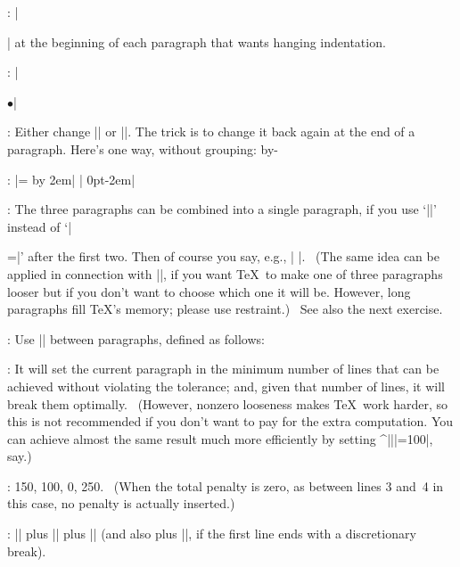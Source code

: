 {{:
 |\item{}| at the beginning of each paragraph that wants hanging
indentation.

:
 |\item{$\bullet$}|

:
 Either change |\hsize| or |\rightskip|. The trick is to change it back
again at the end of a paragraph. Here's one way, without grouping:
\begintt
\let\endgraf=\par \edef\restorehsize{\hsize=\the\hsize}
\def\par{\endgraf \restorehsize \let\par=\endgraf}
\advance\hsize by-\parindent
\endtt

:
 |=\hsize \advance{} by 2em|\parbreak
| 0pt\hsize 0pt\hsize -2em|

:
 The three paragraphs can be combined into a single paragraph, if
you use `|\hfil\vadjust{\vskip\parskip}\break\indent|' instead of
`|\par|' after the first two.  Then of course you say, e.g.,
|\hangindent=-50pt |. \ (The same idea can be applied in
connection with |\looseness|, if you want \TeX\ to make one of three
paragraphs looser but if you don't want to choose which one it will be.
However, long paragraphs fill \TeX's memory; please use restraint.) \
See also the next exercise.

:
 Use |\hangcarryover| between paragraphs, defined as follows:
\begintt
\def\hangcarryover{\edef\next{\hangafter=\the\hangafter
    \hangindent=\the\hangindent}
  \par\next
  \edef\next{\prevgraf=\the\prevgraf}
  \indent\next}
\endtt

:
 It will set the current paragraph in the minimum number of lines
that can be achieved without violating the tolerance; and, given that
number of lines, it will break them optimally. \ (However, nonzero
looseness makes \TeX\ work harder, so this is not recommended if you
don't want to pay for the extra computation. You can achieve almost the
same result much more efficiently by setting ^|\linepenalty||=100|, say.)

:
 150, 100, 0, 250. \ (When the total penalty is zero, as between lines
3 and~4 in this case, no penalty is actually inserted.)

:
 |\interlinepenalty| plus |\clubpenalty| plus |\widowpenalty| (and
also plus |\brokenpenalty|, if the first line ends with a discretionary break).

}}

